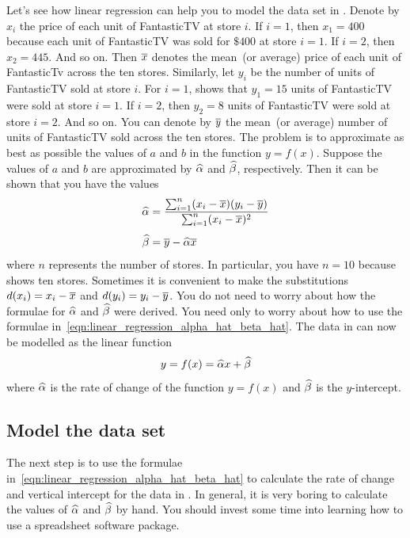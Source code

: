 \documentclass[a4paper,oneside,12pt]{article}
\begin{document}
Let's see how linear regression can help you to model the data set in
.  Denote by $x_i$ the price of each unit of
FantasticTV at store $i$.  If $i = 1$, then $x_1 = 400$ because each
unit of FantasticTV was sold for $\$400$ at store $i = 1$.  If
$i = 2$, then $x_2 = 445$.  And so on.  Then $\overline{x}$ denotes the
mean~(or average) price of each unit of FantasticTv across the ten
stores.  Similarly, let $y_i$ be the number of units of FantasticTV
sold at store $i$.  For $i = 1$,  shows that $y_1 =
15$ units of FantasticTV were sold at store $i = 1$.  If $i = 2$, then
$y_2 = 8$ units of FantasticTV were sold at store $i = 2$.  And so
on.  You can denote by $\overline{y}$ the mean~(or average) number of units
of FantasticTV sold across the ten stores.  The problem is to
approximate as best as possible the values of $a$ and $b$ in the
function $y = f(x)$.  Suppose the values of $a$ and $b$ are
approximated by $\widehat{\alpha}$ and $\widehat{\beta}$, respectively.  Then it can
be shown that you have the values
\begin{equation}
\label{eqn:linear_regression_alpha_hat_beta_hat}
\begin{aligned}
\widehat{\alpha}
&=
\frac{
  \sum_{i=1}^n (x_i - \overline{x}) (y_i - \overline{y})
}{
  \sum_{i=1}^n (x_i - \overline{x})^2
} \\[4pt]
\widehat{\beta}
&=
\overline{y} - \widehat{\alpha} \overline{x}
\end{aligned}
\end{equation}
where $n$ represents the number of stores.  In particular, you have
$n = 10$ because  shows ten stores.  Sometimes it
is convenient to make the substitutions $d(x_i) = x_i - \overline{x}$ and
$d(y_i) = y_i - \overline{y}$.  You do not need to worry about how the
formulae for $\widehat{\alpha}$ and $\widehat{\beta}$ were derived. You need only to
worry about how to use the formulae
in~\eqref{eqn:linear_regression_alpha_hat_beta_hat}.  The data in
 can now be modelled as the linear function
\[
y
=
f(x)
=
\widehat{\alpha} x + \widehat{\beta}
\]
where $\widehat{\alpha}$ is the rate of change of the function $y = f(x)$ and
$\widehat{\beta}$ is the $y$-intercept.



\subsection*{Model the data set}

The next step is to use the formulae
in~\eqref{eqn:linear_regression_alpha_hat_beta_hat} to calculate the
rate of change and vertical intercept for the data in
.  In general, it is very boring to calculate the
values of $\widehat{\alpha}$ and $\widehat{\beta}$ by hand.  You should invest some
time into learning how to use a spreadsheet software package.
\end{document}
